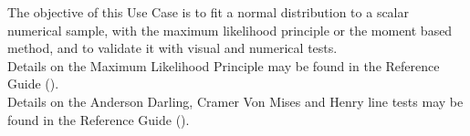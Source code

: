 \renewcommand{\filename}{docUC_InputWithData_NormalFittingTests.tex}
\renewcommand{\filetitle}{UC : Normal distribution fitting test, visual validation tests (Henry line) and numerical validation tests in extreme zones (Anderson Darling test and Cramer Von Mises test)}

\HeaderIIILevel



The objective of this Use Case is to fit a normal distribution to a scalar numerical sample, with the maximum likelihood principle or the moment based method, and to validate it with visual and numerical tests.\\

Details on the Maximum Likelihood  Principle may be found in the Reference Guide ().\\

Details on the Anderson Darling, Cramer Von Mises and Henry line tests  may be found in the Reference Guide ().\\


